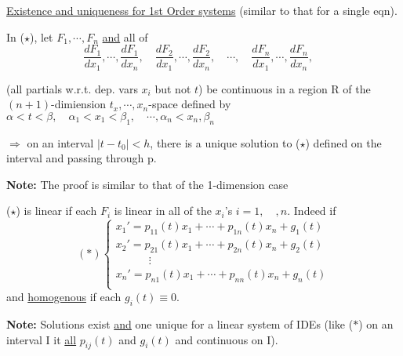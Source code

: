 \underline{Existence and uniqueness for 1st Order systems} (similar to that for a single eqn).
\begin{theorem-N}
	In ($\star$), let $F_1, \cdots, F_n$ \underline{and} all of
	\begin{equation*}
		\dfrac{dF_1}{dx_1}, \cdots, \dfrac{dF_1}{dx_n}, \quad \dfrac{dF_2}{dx_1}, \cdots, \dfrac{dF_2}{dx_n}, \quad \cdots, \quad \dfrac{dF_n}{dx_1}, \cdots, \dfrac{dF_n}{dx_n}, \quad 
	\end{equation*}
	\begin{center}
		(all partials w.r.t. dep. vars $x_i$ but not $t$) be continuous in a region R of the $(n+1)$-dimiension $t_x, \cdots, x_n$-space defined by $\alpha < t < \beta, \quad \alpha_1 < x_1 < \beta_1, \quad \cdots, \alpha_n < x_n, \beta_n$ 
	\end{center}
	$\Rightarrow$ on an interval $|t - t_0| < h$, there is a unique solution to ($\star$) defined on the interval and passing through p.
\end{theorem-N}
\textbf{Note:} The proof is similar to that of the 1-dimension case
\begin{definition}
	($\star$) is linear if each $F_i$ is linear in all of the $x_i$'s $i = 1,\quad, n$. Indeed if 
	\begin{equation*}
		(\ast)
		\begin{cases}
			x_1' = p_{11}(t)x_1 + \cdots + p_{1n}(t)x_n + g_1(t)\\
			x_2' = p_{21}(t)x_1 + \cdots + p_{2n}(t)x_n + g_2(t)\\
			\quad \quad \quad \vdots\\
			x_n' = p_{n1}(t)x_1 + \cdots + p_{nn}(t)x_n + g_n(t)\\
		\end{cases}
	\end{equation*}
	and \underline{homogenous} if each $g_i(t) \equiv 0$.
\end{definition}
\textbf{Note: } Solutions exist \underline{and} one unique for a linear system of IDEs (like ($\ast$) on an interval I it \underline{all} $p_{ij}(t)$ and $g_i(t)$ and continuous on I).